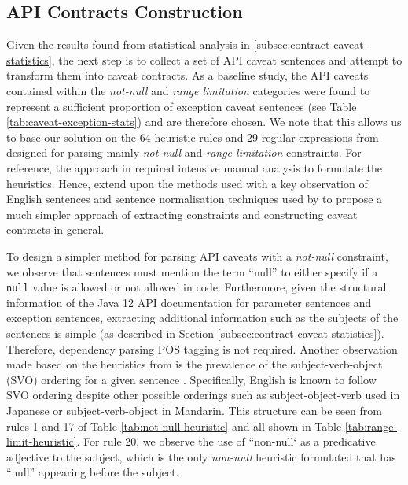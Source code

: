 \subsection{API Contracts Construction}
\label{subsec:contract-construct}
Given the results found from statistical analysis in \ref{subsec:contract-caveat-statistics}, the next step is to collect a set of API caveat sentences and attempt to transform them into caveat contracts. As a baseline study, the API caveats contained within the \textit{not-null} and \textit{range limitation} categories were found to represent a sufficient proportion of exception caveat sentences (see Table \ref{tab:caveat-exception-stats}) and are therefore chosen. 
We note that this allows us to base our solution on the 64 heuristic rules and 29 regular expressions from \cite{zhou-directive} designed for parsing mainly \textit{not-null} and \textit{range limitation} constraints. For reference, the approach in \cite{zhou-directive} required intensive manual analysis to formulate the heuristics. Hence, extend upon the methods used with a key observation of English sentences and sentence normalisation techniques used by \cite{blasi2018translating} to propose a much simpler approach of extracting constraints and constructing caveat contracts in general. \bigbreak

To design a simpler method for parsing API caveats with a \textit{not-null} constraint, we observe that sentences must mention the term ``null'' to either specify if a \lstinline{null} value is allowed or not allowed in code. Furthermore, given the structural information of the Java 12 API documentation for parameter sentences and exception sentences, extracting additional information such as the subjects of the sentences is simple (as described in Section \ref{subsec:contract-caveat-statistics}). Therefore, dependency parsing POS tagging is not required. Another observation made based on the heuristics from \cite{zhou-directive} is the prevalence of the subject-verb-object (SVO) ordering for a given sentence \cite{dryer200581}. Specifically, English is known to follow SVO ordering despite other possible orderings such as subject-object-verb used in Japanese or subject-verb-object in Mandarin. This structure can be seen from rules 1 and 17 of Table \ref{tab:not-null-heuristic} and all shown in Table \ref{tab:range-limit-heuristic}. For rule 20, we observe the use of ``non-null` as a predicative adjective to the subject, which is the only \textit{non-null} heuristic formulated that has ``null'' appearing before the subject. \bigbreak 

